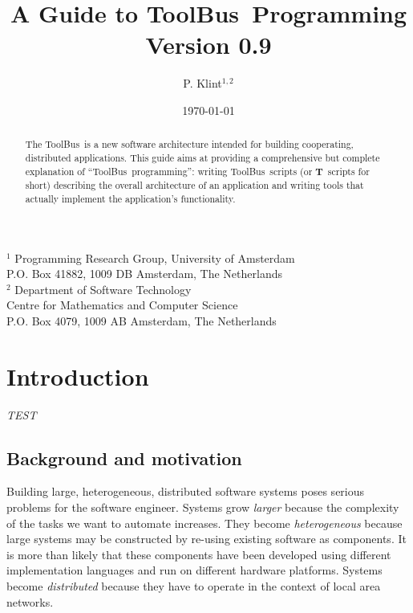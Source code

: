 \setlength{\oddsidemargin}{0.235cm}
\setlength{\evensidemargin}{0.235cm}
\setlength{\textwidth}{16cm}
\topmargin 0.5cm  %
\pagestyle{myheadings}


\newcommand{\TB}{{\sc ToolBus}}
\newcommand{\T}{{\bf T}}
\newcommand{\spec}[1]{{\rm #1}}
\newcommand{\script}[1]{{\tt #1}}
\newcommand{\ASFSDF}{{\sc Asf+Sdf}}
\newcommand{\ASF}{{\sc Asf}}
\newcommand{\SDF}{{\sc Sdf}}
\newcommand{\GEL}{{\sc Gel}}
\newcommand{\iter}{\,^*\,}
\newcommand{\emp}[1]{{\em #1}}
\newcommand{\txttt}[1]{{\tt #1}}



\title{A Guide to \TB\ Programming\\
Version 0.9}
\author{P. Klint$^{1,2}$}
\date{\today}
\maketitle
\begin{center}
       {\footnotesize $^1$ Programming Research Group, University of Amsterdam\\
        P.O. Box 41882, 1009 DB Amsterdam, The Netherlands\\
        $^2$ Department of Software Technology\\
        Centre for Mathematics and Computer Science\\
        P.O. Box 4079, 1009 AB Amsterdam, The Netherlands}
\end{center}

\begin{abstract}
The \TB\ is a new software architecture intended for building
cooperating, distributed applications.  This guide aims at providing a
comprehensive but complete explanation of ``\TB\ programming'':
writing \TB{}ripts (or \T\ scripts for short) describing the overall architecture of an
application and writing tools that actually implement the application's
functionality.

\end{abstract}
\tableofcontents

\newpage

\section{Introduction}

{\em TEST}
\subsection{Background and motivation}
Building large, heterogeneous, distributed software systems poses
serious problems for the software engineer.  Systems grow {\em larger}
because the complexity of the tasks we want to automate
increases.  They become {\em heterogeneous} because large systems may be
constructed by re-using existing software as components.
It is more than likely that these components have been developed
using different implementation languages and run on different
hardware platforms.
Systems become {\em distributed} because they have to operate
in the context of local area networks.

